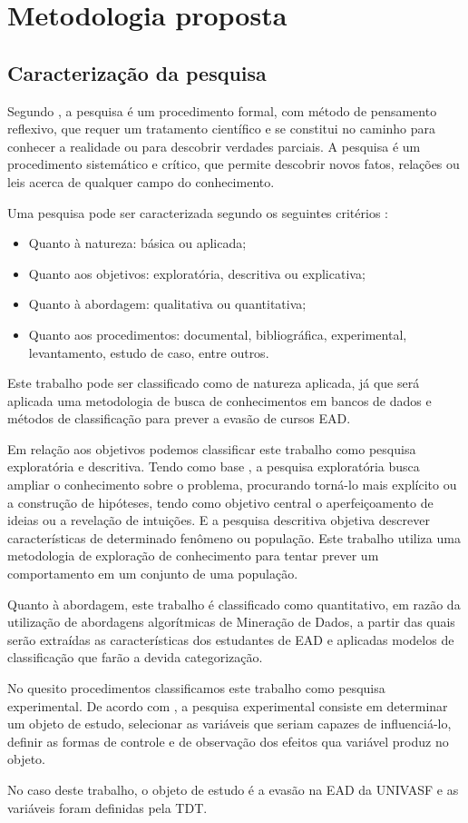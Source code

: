 \chapter{Metodologia proposta}

\section{Caracterização da pesquisa}

Segundo , a pesquisa é um procedimento
formal, com método de pensamento reflexivo, que requer um tratamento científico
e se constitui no caminho para conhecer a realidade ou para descobrir verdades
parciais. A pesquisa é um procedimento sistemático e crítico,  que permite
descobrir novos fatos, relações ou leis acerca de qualquer campo do
conhecimento.

Uma pesquisa pode ser caracterizada segundo os seguintes critérios
\cite{gil2008metodos}:
\begin{itemize}
  \item Quanto à natureza: básica ou aplicada;
  \item Quanto aos objetivos: exploratória, descritiva ou explicativa;
  \item Quanto à abordagem: qualitativa ou quantitativa;
  \item Quanto aos procedimentos: documental, bibliográfica, experimental,
  levantamento, estudo de caso, entre outros.
\end{itemize}

Este trabalho pode ser classificado como de natureza aplicada, já que será
aplicada uma metodologia de busca de conhecimentos em bancos de dados e métodos
de classificação para prever a evasão de cursos EAD.

Em relação aos objetivos podemos classificar este trabalho como pesquisa
exploratória e descritiva. Tendo como base , a
pesquisa exploratória busca ampliar o conhecimento sobre o problema, procurando
torná-lo mais explícito ou a construção de hipóteses, tendo como objetivo
central o aperfeiçoamento de ideias ou a revelação de intuições. E a pesquisa
descritiva objetiva descrever características de determinado fenômeno ou
população. Este trabalho utiliza uma metodologia de exploração de conhecimento
para tentar prever um comportamento em um conjunto de uma população.

Quanto à abordagem, este trabalho é classificado como quantitativo, em razão da
utilização de abordagens algorítmicas de Mineração de Dados, a partir das quais
serão extraídas as características dos estudantes de EAD e aplicadas modelos de
classificação que farão a devida categorização.

No quesito procedimentos classificamos este trabalho como pesquisa experimental.
De acordo com , a pesquisa experimental consiste em
determinar um objeto de estudo, selecionar as variáveis que seriam capazes de
influenciá-lo, definir as formas de controle e de observação dos efeitos  qua
variável produz no objeto.

No caso deste trabalho, o objeto de estudo é a evasão na EAD da UNIVASF e as
variáveis foram definidas pela TDT.
